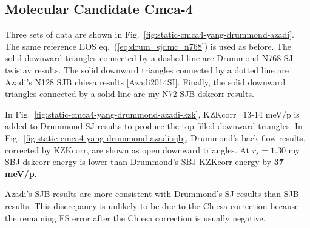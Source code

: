 
\subsection{Molecular Candidate Cmca-4}

Three sets of data are shown in Fig.~\ref{fig:static-cmca4-yang-drummond-azadi}. The same reference EOS eq.~(\ref{eq:drum_sjdmc_n768}) is used as before. The solid downward triangles connected by a dashed line are Drummond N768 SJ twistav results. The solid downward triangles connected by a dotted line are Azadi's N128 SJB chiesa results [Azadi2014SI]. Finally, the solid downward triangles connected by a solid line are my N72 SJB dskcorr results.

In Fig.~\ref{fig:static-cmca4-yang-drummond-azadi-kzk}, KZKcorr=13-14 meV/p is added to Drummond SJ results to produce the top-filled downward triangles. In Fig.~\ref{fig:static-cmca4-yang-drummond-azadi-sjb}, Drummond's back flow results, corrected by KZKcorr, are shown as open downward triangles. At $r_s=1.30$ my SBJ dskcorr energy is lower than Drummond's SBJ KZKcorr energy by \textbf{37 meV/p}.

Azadi's SJB results are more consistent with Drummond's SJ results than SJB results. This discrepancy is unlikely to be due to the Chiesa correction because the remaining FS error after the Chiesa correction is usually negative.

